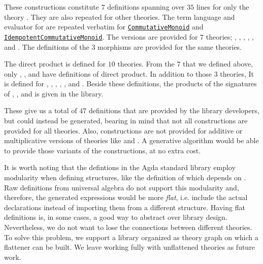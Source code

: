 These constructions constitute $7$ definitions spanning over $35$ lines for only the theory . They are also repeated for other theories. The term language and evaluator for  are repeated verbatim for 
\href{https://github.com/agda/agda-stdlib/blob/c61b159363ce2390049ce8e1e5422f61f17ec3b7/src/Algebra/Solver/CommutativeMonoid.agda}
{\lstinline|CommutativeMonoid|}
and 
\href{https://github.com/agda/agda-stdlib/blob/c61b159363ce2390049ce8e1e5422f61f17ec3b7/src/Algebra/Solver/IdempotentCommutativeMonoid.agda}
{\lstinline|IdempotentCommutativeMonoid|}. The  versions are provided for $7$ theories; , , , , , and . The definitions of the $3$ morphisms are provided for the same theories. 

The direct product is defined for $10$ theories. From the $7$ that we defined above, only , , and  have definitions of direct product. In addition to those $3$ theories, It is defined for , , , , , and . Beside these definitions, the products of the signatures of , , and  is given in the library.  

These give us a total of $47$ definitions that are provided by the library developers, but could instead be generated, bearing in mind that not all constructions are provided for all theories. Also, constructions are not provided for additive or multiplicative versions of theories like  and . A generative algorithm would be able to provide those variants of the constructions, at no extra cost. 

It is worth noting that the defintions in the Agda standard library employ modularity when defining structures, like the definition of  which depends on . Raw definitions from universal algebra do not support this modularity and, therefore, the generated expressions would be more \emph{flat}, i.e. include the actual declarations instead of importing them from a different structure. Having flat definitions is, in some cases, a good way to abstract over library design. Nevertheless, we do not want to lose the connections between different theories. To solve this problem, we support a library organized as theory graph on which a flattener can be built. We leave working fully with unflattened theories as future work.  

